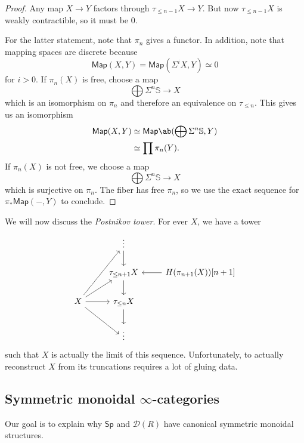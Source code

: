 \documentclass[10pt]{amsart}
\theoremstyle{definition}
\theoremstyle{remark}
\theoremstyle{plain}
\theoremstyle{definition}
\theoremstyle{remark}
\newcommand{\bS}{\mathbb{S}}
\newcommand{\mc}[1]{\mathcal{#1}}
\newcommand{\ms}[1]{\mathsf{#1}}
\newcommand{\1}{\mathbf{1}}
\newcommand{\2}{\mathbf{2}}
\newcommand{\3}{\mathbf{3}}
\begin{document}
\begin{proof}
    Any map $X \to Y$ factors through $\tau_{\leq n-1} X \to Y$. But now $\tau_{\leq n-1} X$ is weakly contractible, so it must be $0$.

    For the latter statement, note that $\pi_n$ gives a functor. In addition, note that mapping spaces are discrete because
    \[ \ms{Map}(X, Y) = \ms{Map}(\Sigma^i X, Y) \simeq 0 \]
    for $i > 0$. If $\pi_n(X)$ is free, choose a map
    \[ \bigoplus \Sigma^n \bS \to X \]
    which is an isomorphism on $\pi_n$ and therefore an equivalence on $\tau_{\leq n}$. This gives us an isomorphism
    \begin{align*}
        \ms{Map}(X, Y) &\simeq \ms{Map} \ab(\bigoplus \Sigma^n \bS, Y) \\
        &\simeq \prod \pi_n(Y).
    \end{align*}
    If $\pi_n(X)$ is not free, we choose a map
    \[ \bigoplus \Sigma^n \bS \to X \]
    which is surjective on $\pi_n$. The fiber has free $\pi_n$, so we use the exact sequence for $\pi_* \ms{Map}(-, Y)$ to conclude.
\end{proof}

We will now discuss the \textit{Postnikov tower}. For ever $X$, we have a tower
\begin{equation*}
\begin{tikzcd}
    & \vdots \ar{d} \\
    & \tau_{\leq n+1} X \ar{d} & H(\pi_{n+1}(X))[n+1] \ar{l} \\
    X \ar{uur} \ar{ur} \ar{r} \ar{dr} & \tau_{\leq n} X \ar{d} \\
    & \vdots
\end{tikzcd}
\end{equation*}
such that $X$ is actually the limit of this sequence. Unfortunately, to actually reconstruct $X$ from its truncations requires a lot of gluing data.


\subsection{Symmetric monoidal $\infty$-categories}%
\label{sub:Symmetric monoidal infinity-categories}

Our goal is to explain why $\ms{Sp}$ and $\mc{D}(R)$ have canonical symmetric monoidal structures.
\end{document}
